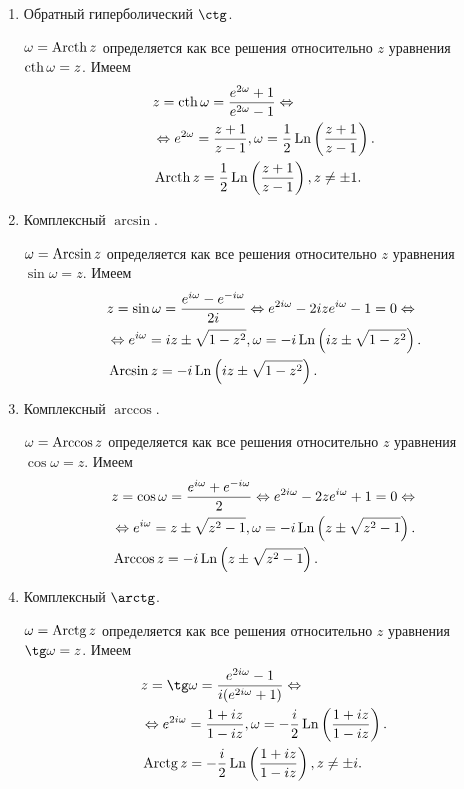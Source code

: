 \begin{enumerate}
\item Обратный гиперболический $\ctg$.

  $\omega = \operatorname{Arcth} z$ определяется как все решения относительно $z$ уравнения $\operatorname{cth} \omega = z$.
  Имеем
  \begin{align*}
    &z = \operatorname{cth} \omega = \dfrac{e^{2\omega} + 1}{e^{2\omega} - 1} \Leftrightarrow\\
    &\Leftrightarrow e^{2\omega} = \dfrac{z + 1}{z - 1}, \omega = \dfrac{1}{2}\operatorname{Ln}
    \left( \dfrac{z + 1}{z - 1} \right).\\
    &\operatorname{Arcth} z = \dfrac{1}{2}\operatorname{Ln}\left( \dfrac{z + 1}{z - 1} \right), z \neq \pm 1.
  \end{align*}

\item Комплексный $\arcsin$.

  $\omega = \operatorname{Arcsin} z$ определяется как все решения относительно $z$ уравнения $\sin \omega = z$.
  Имеем
  \begin{align*}
    &z = \sin \omega = \dfrac{e^{i\omega} - e^{-i\omega}}{2i} \Leftrightarrow
    e^{2i\omega} - 2ize^{i\omega} - 1 = 0 \Leftrightarrow\\
    &\Leftrightarrow e^{i\omega} = iz \pm \sqrt{1 - z^2}, \omega = -i\operatorname{Ln}\left( iz \pm \sqrt{1 -
        z^2} \right).\\
    &\operatorname{Arcsin} z = -i\operatorname{Ln}\left( iz \pm \sqrt{1 - z^2} \right).
  \end{align*}

\item Комплексный $\arccos$.

  $\omega = \operatorname{Arccos} z$ определяется как все решения относительно $z$ уравнения $\cos \omega = z$.
  Имеем
  \begin{align*}
    &z = \cos \omega = \dfrac{e^{i\omega} + e^{-i\omega}}{2} \Leftrightarrow
    e^{2i\omega} - 2ze^{i\omega} + 1 = 0 \Leftrightarrow\\
    &\Leftrightarrow e^{i\omega} = z \pm \sqrt{z^2 - 1}, \omega = -i\operatorname{Ln}\left( z \pm
      \sqrt{z^2 - 1} \right).\\
    &\operatorname{Arccos} z = -i\operatorname{Ln}\left( z \pm \sqrt{z^2 - 1} \right).
  \end{align*}

\item Комплексный $\arctg$.

  $\omega = \operatorname{Arctg} z$ определяется как все решения относительно $z$ уравнения $\tg \omega = z$.
  Имеем
  \begin{align*}
    &z = \tg \omega = \dfrac{e^{2i\omega} - 1}{i(e^{2i\omega} + 1)} \Leftrightarrow\\
    &\Leftrightarrow e^{2i\omega} = \dfrac{1 + iz}{1 - iz}, \omega = -\dfrac{i}{2}\Ln
    \parenthesis{\dfrac{1 + iz}{1 - iz}}.\\
    &\Arctg z = -\dfrac{i}{2}\Ln\parenthesis{\dfrac{1 + iz}{1 - iz}}, z \neq \pm i.
  \end{align*}


\end{enumerate}
